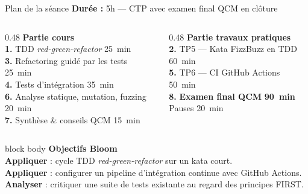 \documentclass[aspectratio=169,11pt]{beamer}
\newcommand{\duree}[1]{{\small\color{accent2}\textbf{Durée :} #1}}
\begin{document}
\begin{frame}[t]{Plan de la séance}
\duree{5h --- CTP avec examen final QCM en clôture}
\vspace{0.4cm}
\begin{columns}[T,onlytextwidth]
\begin{column}{0.48\textwidth}
\textbf{\color{accent}Partie cours}\\[0.2em]
\footnotesize
\textbf{1.} TDD \emph{red-green-refactor} \hfill {\color{textsoft}25~min}\\
\textbf{3.} Refactoring guidé par les tests \hfill {\color{textsoft}25~min}\\
\textbf{4.} Tests d'intégration \hfill {\color{textsoft}35~min}\\
\textbf{6.} Analyse statique, mutation, fuzzing \hfill {\color{textsoft}20~min}\\
\textbf{7.} Synthèse \& conseils QCM \hfill {\color{textsoft}15~min}\\
\end{column}
\begin{column}{0.48\textwidth}
\textbf{\color{accent2}Partie travaux pratiques}\\[0.2em]
\footnotesize
\textbf{2.} TP5 --- Kata FizzBuzz en TDD \hfill {\color{textsoft}60~min}\\
\textbf{5.} TP6 --- CI GitHub Actions \hfill {\color{textsoft}50~min}\\
\textbf{\color{bad}8.} \textbf{Examen final QCM} \hfill \textbf{\color{bad}90~min}\\[0.2em]
{\color{textsoft}Pauses \hfill 20~min}
\end{column}
\end{columns}
\vspace{0.4cm}
\begin{beamercolorbox}[wd=\linewidth,sep=0.5em,rounded=true]{block body}
{\color{accent}\bfseries\small Objectifs Bloom}\\[0.1em]
\footnotesize
\textbf{Appliquer} : cycle TDD \emph{red-green-refactor} sur un kata court.\\
\textbf{Appliquer} : configurer un pipeline d'intégration continue avec GitHub Actions.\\
\textbf{Analyser} : critiquer une suite de tests existante au regard des principes FIRST.
\end{beamercolorbox}
\end{frame}

\end{document}
